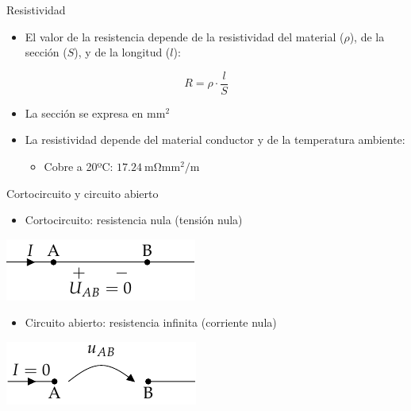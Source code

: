 \documentclass[aspectratio=169, xcolor={usenames,svgnames,dvipsnames}]{beamer}
\begin{document}

\begin{frame}{Resistividad}
    \begin{itemize}
        \item El valor de la resistencia depende de la \alert{resistividad del material} (\(\rho\)), de la \alert{sección} (\(S\)), y de la
        longitud (\(l\)):
    \end{itemize}
    \begin{equation*}
      R = \rho \cdot \frac{l}{S}
    \end{equation*}
    
    \begin{itemize}
        \item La \alert{sección} se expresa en \(\si{\milli\meter\squared}\)
        
        \vspace{4mm}
        \item La \alert{resistividad} depende del material conductor y de la temperatura ambiente:
        \vspace{2mm}
        \begin{itemize}
            \item \normalsize{Cobre a 20ºC: \(\qty{17.24}{\milli\ohm\milli\meter\squared\per\meter}\)}
        \end{itemize}
    \end{itemize}
\end{frame}


\begin{frame}{Cortocircuito y circuito abierto}
    \begin{itemize}
    \item \alert{Cortocircuito}: resistencia nula (tensión nula)
    \end{itemize}
    
    \begin{center}
    \includegraphics[height=0.2\textheight]{../figs/Cortocircuito.pdf}
    \end{center}
    
    \begin{itemize}
    \item \alert{Circuito abierto}: resistencia infinita (corriente nula)
    \end{itemize}
    
    \begin{center}
    \includegraphics[height=0.2\textheight]{../figs/CircuitoAbierto.pdf}
    \end{center}
\end{frame}
\end{document}
